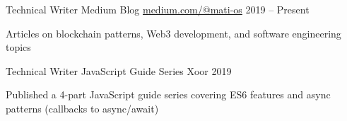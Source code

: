 


\begin{cventries}


\cventry
{Technical Writer} %
{Medium Blog} %
{\href{https://medium.com/@mati-os}{medium.com/@mati-os}} %
{2019 – Present} %
{ %
\begin{cvitems}
\item {Articles on blockchain patterns, Web3 development, and software engineering topics}
\end{cvitems}
}


\cventry
{Technical Writer} %
{JavaScript Guide Series} %
{Xoor} %
{2019} %
{ %
\begin{cvitems}
\item {Published a 4-part JavaScript guide series covering ES6 features and async patterns (callbacks to async/await)}
\end{cvitems}
}

\end{cventries}
